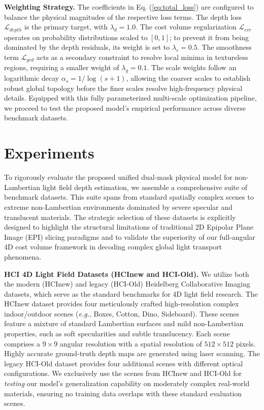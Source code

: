 \documentclass[lettersize,journal]{IEEEtran}
\begin{document}
\textbf{Weighting Strategy.} 
The coefficients in Eq. (\ref{eq:total_loss}) are configured to balance the physical magnitudes of the respective loss terms. The depth loss $\mathcal{L}_{depth}$ is the primary target, with $\lambda_{d} = 1.0$. The cost volume regularization $\mathcal{L}_{cvr}$ operates on probability distributions scaled to $[0,1]$; to prevent it from being dominated by the depth residuals, its weight is set to $\lambda_{c} = 0.5$. The smoothness term $\mathcal{L}_{gcd}$ acts as a secondary constraint to resolve local minima in textureless regions, requiring a smaller weight of $\lambda_{g} = 0.1$. The scale weights follow an logarithmic decay $\alpha_s = 1/\log(s+1)$, allowing the coarser scales to establish robust global topology before the finer scales resolve high-frequency physical details. Equipped with this fully parameterized multi-scale optimization pipeline, we proceed to test the proposed model's empirical performance across diverse benchmark datasets.

\section{Experiments}

To rigorously evaluate the proposed unified dual-mask physical model for non-Lambertian light field depth estimation, we assemble a comprehensive suite of benchmark datasets. This suite spans from standard spatially complex scenes to extreme non-Lambertian environments dominated by severe specular and translucent materials. The strategic selection of these datasets is explicitly designed to highlight the structural limitations of traditional 2D Epipolar Plane Image (EPI) slicing paradigms and to validate the superiority of our full-angular 4D cost volume framework in decoding complex global light transport phenomena.

\textbf{HCI 4D Light Field Datasets (HCInew and HCI-Old).} 
We utilize both the modern (HCInew) and legacy (HCI-Old) Heidelberg Collaborative Imaging datasets, which serve as the standard benchmarks for 4D light field research. The HCInew dataset provides four meticulously crafted high-resolution complex indoor/outdoor scenes (\textit{e.g.}, Boxes, Cotton, Dino, Sideboard). These scenes feature a mixture of standard Lambertian surfaces and mild non-Lambertian properties, such as soft specularities and subtle translucency. Each scene comprises a $9 \times 9$ angular resolution with a spatial resolution of $512 \times 512$ pixels. Highly accurate ground-truth depth maps are generated using laser scanning. The legacy HCI-Old dataset provides four additional scenes with different optical configurations. We exclusively use the scenes from HCInew and HCI-Old for \textit{testing} our model's generalization capability on moderately complex real-world materials, ensuring no training data overlaps with these standard evaluation scenes.
\end{document}
